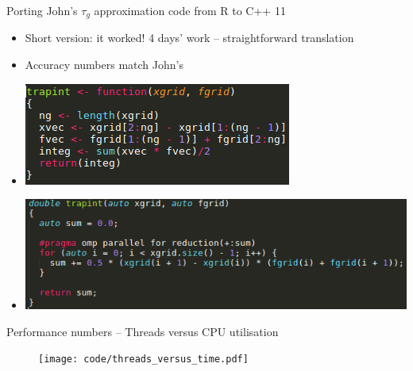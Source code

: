 \documentclass{beamer}
\begin{document}
\begin{frame}{Porting John's $\tau_g$ approximation code from R to C++ 11}
\begin{itemize}
\item Short version: it worked! 4 days' work -- straightforward translation
\item Accuracy numbers match John's
\item
\includegraphics[scale=.5]{trapint_R.png}
\item
\includegraphics[scale=.5]{trapint_cpp.png}
\end{itemize}
\end{frame}

\begin{frame}{Performance numbers -- Threads versus CPU utilisation}
\begin{figure}
\texttt{[image: code/threads\_versus\_time.pdf]}
\end{figure}

\end{frame}
\end{document}
